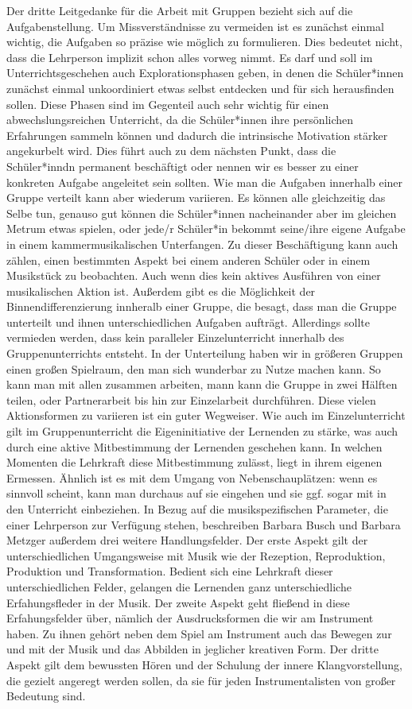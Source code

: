 Der dritte Leitgedanke für die Arbeit mit Gruppen bezieht sich auf die
Aufgabenstellung. Um Missverständnisse zu vermeiden ist es zunächst einmal
wichtig, die Aufgaben so präzise wie möglich zu formulieren. Dies bedeutet
nicht, dass die Lehrperson implizit schon alles vorweg nimmt. Es darf und soll
im Unterrichtsgeschehen auch Explorationsphasen geben, in denen die
Schüler*innen zunächst einmal unkoordiniert etwas selbst entdecken und für sich
herausfinden sollen. Diese Phasen sind im Gegenteil auch sehr wichtig für einen
abwechslungsreichen Unterricht, da die Schüler*innen ihre persönlichen
Erfahrungen sammeln können und dadurch die intrinsische Motivation stärker
angekurbelt wird. Dies führt auch zu dem nächsten Punkt, dass die Schüler*inndn
permanent beschäftigt oder nennen wir es besser zu einer konkreten Aufgabe
angeleitet sein sollten. Wie man die Aufgaben innerhalb einer Gruppe verteilt
kann aber wiederum variieren. Es können alle gleichzeitig das Selbe tun, genauso
gut können die Schüler*innen nacheinander aber im gleichen Metrum etwas spielen,
oder jede/r Schüler*in bekommt seine/ihre eigene Aufgabe in einem
kammermusikalischen Unterfangen. Zu dieser Beschäftigung kann auch zählen, einen
bestimmten Aspekt bei einem anderen Schüler oder in einem Musikstück zu
beobachten. Auch wenn dies kein aktives Ausführen von einer musikalischen Aktion
ist. Außerdem gibt es die Möglichkeit der Binnendifferenzierung innheralb einer
Gruppe, die besagt, dass man die Gruppe unterteilt und ihnen unterschiedlichen
Aufgaben aufträgt. Allerdings sollte vermieden werden, dass kein paralleler
Einzelunterricht innerhalb des Gruppenunterrichts entsteht. In der Unterteilung
haben wir in größeren Gruppen einen großen Spielraum, den man sich wunderbar zu
Nutze machen kann. So kann man mit allen zusammen arbeiten, mann kann die Gruppe
in zwei Hälften teilen, oder Partnerarbeit bis hin zur Einzelarbeit durchführen.
Diese vielen Aktionsformen zu variieren ist ein guter Wegweiser. Wie auch im
Einzelunterricht gilt im Gruppenunterricht die Eigeninitiative der Lernenden zu
stärke, was auch durch eine aktive Mitbestimmung der Lernenden geschehen kann.
In welchen Momenten die Lehrkraft diese Mitbestimmung zulässt, liegt in ihrem
eigenen Ermessen. Ähnlich ist es mit dem Umgang von Nebenschauplätzen: wenn es
sinnvoll scheint, kann man durchaus auf sie eingehen und sie ggf. sogar mit in
den Unterricht einbeziehen. In Bezug auf die musikspezifischen Parameter, die
einer Lehrperson zur Verfügung stehen, beschreiben Barbara Busch und Barbara
Metzger außerdem drei weitere Handlungsfelder. Der erste Aspekt gilt der
unterschiedlichen Umgangsweise mit Musik wie der Rezeption, Reproduktion,
Produktion und Transformation. Bedient sich eine Lehrkraft dieser unterschiedlichen
Felder, gelangen die Lernenden ganz unterschiedliche Erfahungsfleder in der
Musik. Der zweite Aspekt geht fließend in diese Erfahungsfelder über, nämlich
der Ausdrucksformen die wir am Instrument haben. Zu ihnen gehört neben dem Spiel
am Instrument auch das Bewegen zur und mit der Musik und das Abbilden in
jeglicher kreativen Form. Der dritte Aspekt gilt dem bewussten Hören und der
Schulung der innere Klangvorstellung, die gezielt angeregt werden sollen, da sie
für jeden Instrumentalisten von großer Bedeutung sind.

